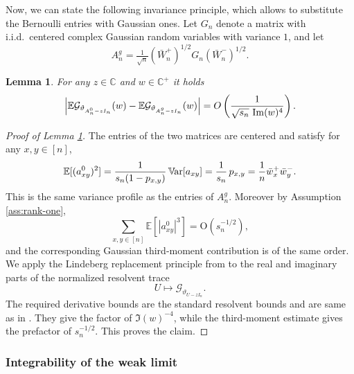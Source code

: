 \documentclass[11pt,oneside]{amsart}
\theoremstyle{plain}
\newtheorem{lemma}[theorem]{Lemma}
\numberwithin{equation}{section}
\newcommand{\iid}{{i.i.d.~}}
\newcommand{\E}{\mathbb{E}}
\newcommand{\var}{\mathbb{V}\hspace{-1.pt}{\rm ar}}
\newcommand{\scaling}{s_n}
\begin{document}
Now, we can state the following invariance principle, which allows to substitute the Bernoulli entries with Gaussian ones.
Let $G_n$ denote a matrix with \iid centered complex Gaussian random variables with variance $1$, and let
 \begin{equation}
    {A}_n^g=\tfrac{1}{\sqrt{n}}(\bar{W}_n^+)^{1/2}G_n (\bar{W}_n^-)^{1/2}.
\end{equation}
\begin{lemma} \label{lemma:Lindeberg}
    For any $z \in \mathbb{C}$ and $w\in \mathbb{C}^+$ it holds 
        \begin{equation}
        \Big|\E \mathcal{G}_{\vartheta_{{A}_n^0-zI_n}}(w) - \E \mathcal{G}_{\vartheta_{{A}_n^g-zI_n}} (w)\Big| = O\left(\frac{1}{\sqrt{\scaling}\ {\rm Im}(w)^4} 
        \right).
    \end{equation}
\end{lemma}
\begin{proof}[Proof of Lemma \ref{lemma:Lindeberg}]
   The entries of the two matrices are centered and  satisfy for any $x,y \in [n]$,
    \begin{equation} \label{eq:lindeberg}
        \E[(a^0_{xy})^2] 
        =  \frac{1}{ {\scaling}(1-p_{x,y})}\,\var[a_{xy}]
        =  \frac{1}{ {\scaling}} \,p_{x,y}
        = \frac{1}{n}\bar{w}_x^{+} \bar{w}_y^{-}.
    \end{equation}
    This is the same variance profile as the entries of $A_n^g$. Moreover by Assumption \ref{ass:rank-one},
    $$ \sum_{x,y\in [n]}\E[| a_{xy}^0|^3]= \mathrm{O}(s_n^{-1/2}),$$
    and the corresponding Gaussian third-moment contribution is of the same order. We apply the Lindeberg replacement principle from \cite{Chatterjee2} to the real and imaginary parts of the normalized resolvent trace
    $$U\mapsto \mathcal{G}_{\vartheta_{U-zI_n}}.$$
    The required derivative bounds are the standard resolvent bounds and are same as in \cite[Lemma 8.2]{Cook}. They give the factor of $\Im(w)^{-4}$, while the third-moment estimate gives the prefactor of $s_n^{-1/2}$. This proves the claim.
\end{proof}


\subsubsection{Integrability of the weak limit}
\end{document}
